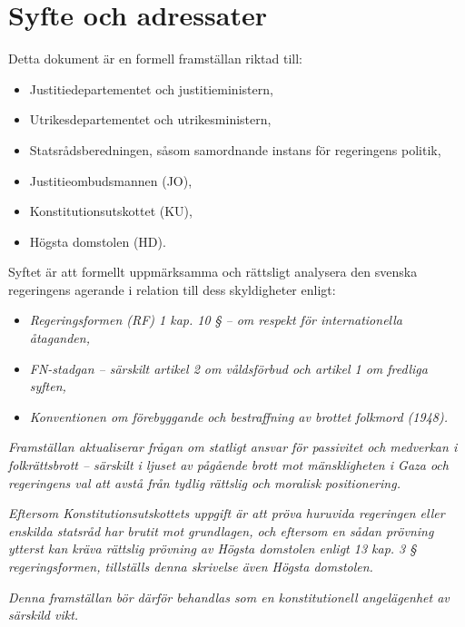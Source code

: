 \section{Syfte och adressater}
\label{sec:syfte}


Detta dokument är en formell framställan riktad till:

\begin{itemize}
  \item Justitiedepartementet och justitieministern,
  \item Utrikesdepartementet och utrikesministern,
  \item Statsrådsberedningen, såsom samordnande instans för regeringens politik,
  \item Justitieombudsmannen (JO),
  \item Konstitutionsutskottet (KU),
  \item Högsta domstolen (HD).
\end{itemize}

\begin{spacing}{1.2}
Syftet är att formellt uppmärksamma och rättsligt analysera den svenska regeringens agerande i relation till dess skyldigheter enligt:

\begin{itemize}
  \item \textit{Regeringsformen (RF) 1 kap. 10 § – om respekt för internationella åtaganden,}
  \item \textit{FN-stadgan – särskilt artikel 2 om våldsförbud och artikel 1 om fredliga syften,}
  \item \textit{Konventionen om förebyggande och bestraffning av brottet folkmord (1948).}
\end{itemize}

\vspace{0.5cm}
\textit{
Framställan aktualiserar frågan om statligt ansvar för passivitet och medverkan i folkrättsbrott – särskilt i ljuset av pågående brott mot mänskligheten i Gaza och regeringens val att avstå från tydlig rättslig och moralisk positionering.
}

\vspace{0.5cm}
\textit{
Eftersom Konstitutionsutskottets uppgift är att pröva huruvida regeringen eller enskilda statsråd har brutit mot grundlagen, och eftersom en sådan prövning ytterst kan kräva rättslig prövning av Högsta domstolen enligt 13 kap. 3 § regeringsformen, tillställs denna skrivelse även Högsta domstolen.
}

\vspace{0.5cm}
\textit{
Denna framställan bör därför behandlas som en konstitutionell angelägenhet av särskild vikt.
}
\end{spacing}

